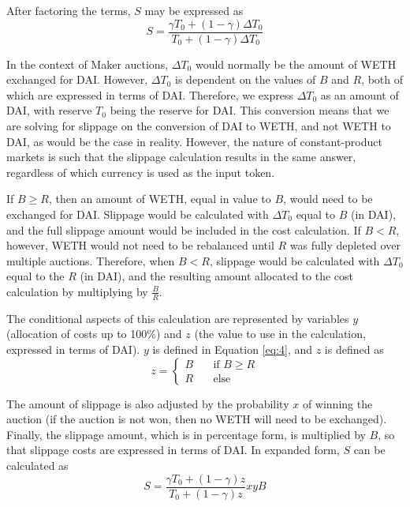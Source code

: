 \documentclass[conference]{IEEEtran}
\begin{document}
After factoring the terms, $S$ may be expressed as
\begin{equation}
\label{eq:3}
    S = \frac{\gamma T_0 + (1-\gamma)\Delta T_0}{T_0 + (1-\gamma)\Delta T_0}
\end{equation}

In the context of Maker auctions, $\Delta T_0$ would normally be the amount of WETH exchanged for DAI. However, $\Delta T_0$ is dependent on the values of $B$ and $R$, both of which are expressed in terms of DAI. Therefore, we express $\Delta T_0$ as an amount of DAI, with reserve $T_0$ being the reserve for DAI. This conversion means that we are solving for slippage on the conversion of DAI to WETH, and not WETH to DAI, as would be the case in reality. However, the nature of constant-product markets is such that the slippage calculation results in the same answer, regardless of which currency is used as the input token.

If $B \geq R$, then an amount of WETH, equal in value to $B$, would need to be exchanged for DAI. Slippage would be calculated with $\Delta T_0$ equal to $B$ (in DAI), and the full slippage amount would be included in the cost calculation. If $B < R$, however, WETH would not need to be rebalanced until $R$ was fully depleted over multiple auctions. Therefore, when $B < R$, slippage would be calculated with $\Delta T_0$ equal to the $R$ (in DAI), and the resulting amount allocated to the cost calculation by multiplying by $\frac{B}{R}$. 

The conditional aspects of this calculation are represented by variables $y$ (allocation of costs up to 100\%) and $z$ (the value to use in the calculation, expressed in terms of DAI). $y$ is defined in Equation \eqref{eq:4}, and $z$ is defined as 
\begin{equation}
        z = 
        \begin{cases}
            B       &\quad \text{if } B\geq R\\
            R       &\quad \text{else}
        \end{cases}
\end{equation}

The amount of slippage is also adjusted by the probability $x$ of winning the auction (if the auction is not won, then no WETH will need to be exchanged). Finally, the slippage amount, which is in percentage form, is multiplied by $B$, so that slippage costs are expressed in terms of DAI. In expanded form, $S$ can be calculated as
\begin{equation}
\label{eq:5}
        S = \frac{\gamma T_0 + (1-\gamma)z}{T_0 + (1-\gamma)z} x y B
\end{equation}
\end{document}

